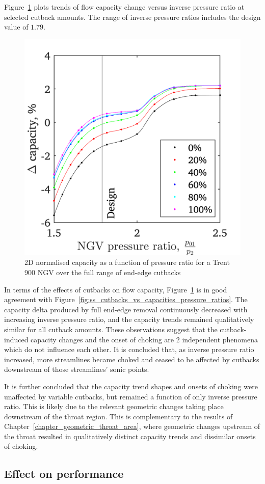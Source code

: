 \documentclass[a4paper, 11pt, oneside]{report}
\begin{document}
Figure~\ref{fig:ss_cutbacks_vs_capacities_trends} plots trends of flow capacity change versus inverse pressure ratio at selected cutback amounts. The range of inverse pressure ratios includes the design value of $1.79$.

\begin{figure}[H]
	\centering
	\includegraphics[width=.45\textwidth]{figs/ss_cutbacks_vs_capacities_trends.png}
	\caption{2D normalised capacity as a function of pressure ratio for a Trent 900 NGV over the full range of end-edge cutbacks}
    \label{fig:ss_cutbacks_vs_capacities_trends}
\end{figure}

In terms of the effects of cutbacks on flow capacity, Figure~\ref{fig:ss_cutbacks_vs_capacities_trends} is in good agreement with Figure~\ref{fig:ss_cutbacks_vs_capacities_pressure_ratios}. The capacity delta produced by full end-edge removal continuously decreased with increasing inverse pressure ratio, and the capacity trends remained qualitatively similar for all cutback amounts. These observations suggest that the cutback-induced capacity changes and the onset of choking are 2 independent phenomena which do not influence each other. It is concluded that, as inverse pressure ratio increased, more streamlines became choked and ceased to be affected by cutbacks downstream of those streamlines' sonic points. 

It is further concluded that the capacity trend shapes and onsets of choking were unaffected by variable cutbacks, but remained a function of only inverse pressure ratio. This is likely due to the relevant geometric changes taking place downstream of the throat region. This is complementary to the results of Chapter~\ref{chapter_geometric_throat_area}, where geometric changes upstream of the throat resulted in qualitatively distinct capacity trends and dissimilar onsets of choking.

\subsection{Effect on performance}
\end{document}
